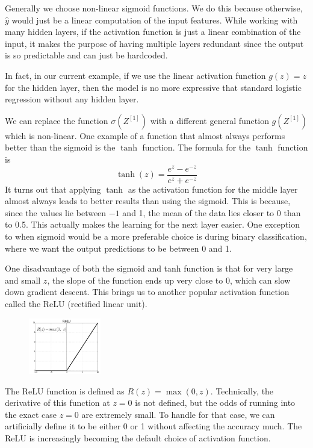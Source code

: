 \documentclass{article}[a4paper,12pt]
\theoremstyle{definition}
\begin{document}
Generally we choose non-linear sigmoid functions. We do this because otherwise, $\hat{y}$ would just be a linear computation of the input features. While working with many hidden layers, if the activation function is just a linear combination of the input, it makes the purpose of having multiple layers redundant since the output is so predictable and can just be hardcoded.
\vspace{6pt}

In fact, in our current example, if we use the linear activation function $g(z)=z$ for the hidden layer, then the model is no more expressive that standard logistic regression without any hidden layer.
\vspace{6pt}

We can replace the function $\sigma(Z^{[1]})$ with a different general function $g(Z^{[1]})$ which is non-linear. One example of a function that almost always performs better than the sigmoid is the $\tanh$ function. The formula for the $\tanh$ function is
$$\tanh(z)=\frac{e^z-e^{-z}}{e^z+e^{-z}}$$
It turns out that applying $\tanh$ as the activation function for the middle layer almost always leads to better results than using the sigmoid. This is because, since the values lie between $-1$ and 1, the mean of the data lies closer to 0 than to 0.5. This actually makes the learning for the next layer easier. One exception to when sigmoid would be a more preferable choice is during binary classification, where we want the output predictions to be between 0 and 1.
\vspace{6pt}

One disadvantage of both the sigmoid and tanh function is that for very large and small $z$, the slope of the function ends up very close to 0, which can slow down gradient descent. This brings us to another popular activation function called the ReLU (rectified linear unit).
\begin{figure}
\centering \includegraphics[width=0.28\textwidth]{relu.png}
\end{figure}
\vspace{6pt}

The ReLU function is defined as $R(z)=\max(0,z)$. Technically, the derivative of this function at $z=0$ is not defined, but the odds of running into the exact case $z=0$ are extremely small. To handle for that case, we can artificially define it to be either 0 or 1 without affecting the accuracy much. The ReLU is increasingly becoming the default choice of activation function. 
\vspace{-6pt}
\end{document}
